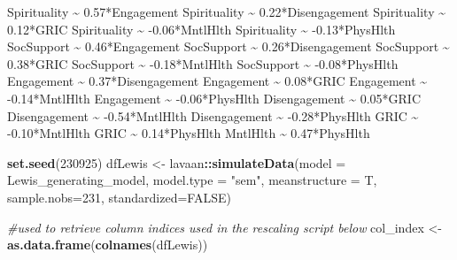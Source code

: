 \documentclass[
  11pt,
]{book}
\newenvironment{Shaded}{\begin{snugshade}}{\end{snugshade}}
\newcommand{\AttributeTok}[1]{\textcolor[rgb]{0.27,0.27,0.27}{#1}}
\newcommand{\CommentTok}[1]{\textcolor[rgb]{0.37,0.37,0.37}{\textit{#1}}}
\newcommand{\ConstantTok}[1]{\textcolor[rgb]{0.37,0.37,0.37}{#1}}
\newcommand{\DecValTok}[1]{\textcolor[rgb]{0.06,0.06,0.06}{#1}}
\newcommand{\FunctionTok}[1]{\textcolor[rgb]{0.27,0.27,0.27}{\textbf{#1}}}
\newcommand{\NormalTok}[1]{#1}
\newcommand{\OtherTok}[1]{\textcolor[rgb]{0.37,0.37,0.37}{#1}}
\newcommand{\SpecialCharTok}[1]{\textcolor[rgb]{0.43,0.43,0.43}{\textbf{#1}}}
\newcommand{\StringTok}[1]{\textcolor[rgb]{0.5,0.5,0.5}{#1}}
\begin{document}
\begin{Shaded}
\begin{Highlighting}[]
\StringTok{         Spirituality \textasciitilde{} 0.57*Engagement}
\StringTok{         Spirituality \textasciitilde{} 0.22*Disengagement}
\StringTok{         Spirituality \textasciitilde{} 0.12*GRIC}
\StringTok{         Spirituality \textasciitilde{} {-}0.06*MntlHlth}
\StringTok{         Spirituality \textasciitilde{} {-}0.13*PhysHlth}
\StringTok{         }
\StringTok{         SocSupport \textasciitilde{} 0.46*Engagement}
\StringTok{         SocSupport \textasciitilde{} 0.26*Disengagement}
\StringTok{         SocSupport \textasciitilde{} 0.38*GRIC}
\StringTok{         SocSupport \textasciitilde{} {-}0.18*MntlHlth}
\StringTok{         SocSupport \textasciitilde{} {-}0.08*PhysHlth}
\StringTok{         }
\StringTok{         Engagement \textasciitilde{} 0.37*Disengagement}
\StringTok{         Engagement \textasciitilde{} 0.08*GRIC}
\StringTok{         Engagement \textasciitilde{} {-}0.14*MntlHlth}
\StringTok{         Engagement \textasciitilde{} {-}0.06*PhysHlth}
\StringTok{         }
\StringTok{         Disengagement \textasciitilde{} 0.05*GRIC}
\StringTok{         Disengagement \textasciitilde{} {-}0.54*MntlHlth}
\StringTok{         Disengagement \textasciitilde{} {-}0.28*PhysHlth}
\StringTok{         }
\StringTok{         GRIC \textasciitilde{} {-}0.10*MntlHlth}
\StringTok{         GRIC \textasciitilde{} 0.14*PhysHlth}
\StringTok{     }
\StringTok{         MntlHlth \textasciitilde{} 0.47*PhysHlth         }
\StringTok{        \textquotesingle{}}

\FunctionTok{set.seed}\NormalTok{(}\DecValTok{230925}\NormalTok{)}
\NormalTok{dfLewis }\OtherTok{\textless{}{-}}\NormalTok{ lavaan}\SpecialCharTok{::}\FunctionTok{simulateData}\NormalTok{(}\AttributeTok{model =}\NormalTok{ Lewis\_generating\_model,}
                              \AttributeTok{model.type =} \StringTok{"sem"}\NormalTok{,}
                              \AttributeTok{meanstructure =}\NormalTok{ T,}
                              \AttributeTok{sample.nobs=}\DecValTok{231}\NormalTok{,}
                              \AttributeTok{standardized=}\ConstantTok{FALSE}\NormalTok{)}

\CommentTok{\#used to retrieve column indices used in the rescaling script below}
\NormalTok{col\_index }\OtherTok{\textless{}{-}} \FunctionTok{as.data.frame}\NormalTok{(}\FunctionTok{colnames}\NormalTok{(dfLewis))}


\end{Highlighting}
\end{Shaded}
\end{document}
